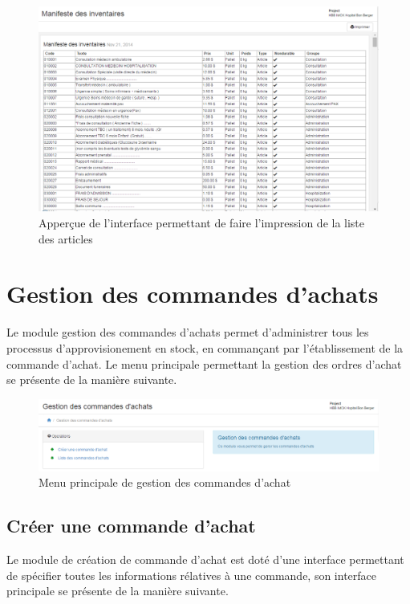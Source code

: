 \documentclass[12pt,a4paper]{report}
\begin{document}
\begin{figure}[h]
\begin{center}
\includegraphics[width=14cm]{pic/manifInventaire.png}
\end{center}
\caption{Apperçue de l'interface permettant de faire l'impression de la liste des articles}
\label{Apperçue de l'interface permettant de faire l'impression de la liste des articles}
\end{figure}

\newpage
\section{Gestion des commandes d'achats}
Le module gestion des commandes d'achats permet d'administrer tous les processus d'approvisionement en stock, en commançant par l'établissement de la commande d'achat. Le menu principale permettant la gestion des ordres d'achat se présente de la manière suivante.

\begin{figure}[h]
\begin{center}
\includegraphics[width=14cm]{pic/GestOrdAchat.png}
\end{center}
\caption{Menu principale de gestion des commandes d'achat}
\label{Menu principale de gestion des commandes d'achat}
\end{figure}

\subsection{Créer une commande d'achat}
Le module de création de commande d'achat est doté d'une interface permettant de spécifier toutes les informations rélatives à une commande, son interface principale se présente de la manière suivante.
\end{document}
